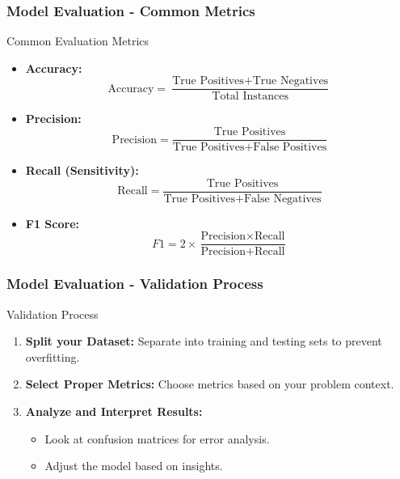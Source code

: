 \documentclass[aspectratio=169]{beamer}
\begin{document}
\begin{frame}[fragile]
    \frametitle{Model Evaluation - Common Metrics}
    \begin{block}{Common Evaluation Metrics}
        \begin{itemize}
            \item \textbf{Accuracy:}
            \begin{equation}
                \text{Accuracy} = \frac{\text{True Positives} + \text{True Negatives}}{\text{Total Instances}}
            \end{equation}
            \item \textbf{Precision:}
            \begin{equation}
                \text{Precision} = \frac{\text{True Positives}}{\text{True Positives} + \text{False Positives}}
            \end{equation}
            \item \textbf{Recall (Sensitivity):}
            \begin{equation}
                \text{Recall} = \frac{\text{True Positives}}{\text{True Positives} + \text{False Negatives}}
            \end{equation}
            \item \textbf{F1 Score:}
            \begin{equation}
                F1 = 2 \times \frac{\text{Precision} \times \text{Recall}}{\text{Precision} + \text{Recall}}
            \end{equation}
        \end{itemize}
    \end{block}
\end{frame}

\begin{frame}[fragile]
    \frametitle{Model Evaluation - Validation Process}
    \begin{block}{Validation Process}
        \begin{enumerate}
            \item \textbf{Split your Dataset:} Separate into training and testing sets to prevent overfitting.
            \item \textbf{Select Proper Metrics:} Choose metrics based on your problem context.
            \item \textbf{Analyze and Interpret Results:} 
            \begin{itemize}
                \item Look at confusion matrices for error analysis.
                \item Adjust the model based on insights.
            \end{itemize}
        \end{enumerate}
    \end{block}
\end{frame}
\end{document}

